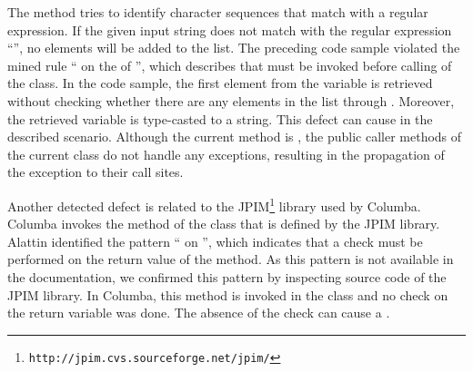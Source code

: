 {The method  tries to identify character sequences
that match with a regular expression. If the given input string does not match with the regular expression
``'', no elements will be added to the  list.
The preceding code sample violated the mined rule `` on the  of
  '',
which describes that  must be invoked before 
calling  of the  class.  In the code sample,
the first element from the  variable is retrieved without checking whether there
are any elements in the list through . Moreover, 
the retrieved variable is type-casted to a string. This defect
can cause  in the described scenario. Although the current method
is , the public caller methods of the current class do not handle any
exceptions, resulting in the propagation of the exception to their call sites. 

Another detected defect is related to the JPIM\footnote{\texttt{http://jpim.cvs.sourceforge.net/jpim/}} 
library used by Columba. Columba invokes the method 
of the class  that is defined by the JPIM library. 
Alattin identified the pattern `` on  
'', which indicates that a  check must be 
performed on the return value of the  method. 
As this pattern is not available in the documentation, we confirmed this pattern by inspecting 
source code of the JPIM library.
In Columba, this method is invoked in the class 
and no  check on the return variable was done. The absence of the  check 
can cause a .

}


